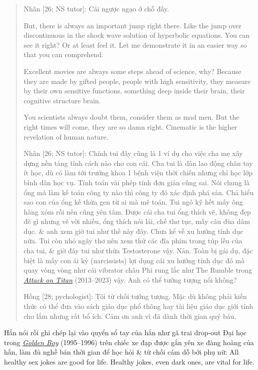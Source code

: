 \documentclass[12pt,twoside]{book}
\begin{document}
\begin{quote}
	{\sf Nhân [26; NS tutor]}: Cái ngược ngạo ở chỗ đấy. 
	
	But, there is always an important jump right there. Like the jump over discontinuous in the shock wave solution of hyperbolic equations. You can see it right? Or at least feel it. Let me demonstrate it in an easier way so that you can comprehend.
	
	Excellent movies are always some steps ahead of science, why? Because they are made by gifted people, people with high sensitivity, they measure by their own sensitive functions, something deep inside their brain, their cognitive structure brain.
	
	You scientists always doubt them, consider them as mad men. But the right times will come, they are so damn right. Cinematic is the higher revelation of human nature.
	
	{\sf Nhân [26; NS tutor]}: Chính tui đây cũng là 1 ví dụ cho việc cha mẹ xây dựng nền tảng tính cách nào cho con cái. Cha tui là dân lao động chân tay ít học, dù có làm tới trưởng khoa 1 bệnh viện thời chiến nhưng chỉ học lớp bình dân học vụ. Tính toán vài phép tính đơn giản cũng sai. Nói chung là ổng mà làm kế toán công ty nào thì công ty đó xác định phá sản. Chả hiểu sao con của ổng kế thừa gen từ ai mà mê toán. Tui ngó kỹ hết mấy ông hàng xóm rồi nên cũng yên tâm. Được cái cha tui ổng thích vẽ, không đẹp đẽ gì nhưng vẽ vời nhiều, ổng thích nói lái, chế thơ tục, mấy câu đùa dâm dục. \& anh xem giờ tui như thế này đây. Chưa kể về xu hướng tính dục nữa. Tui còn nhỏ ngây thơ nên xem thử các đĩa phim trong túp lều của cha tui, \& giờ đây tui như thừa Testosterone vậy. Nản. Toàn bị gái dụ, đặc biệt là mấy con ái kỷ (narcissists) lợi dụng cái xu hướng tính dục đó mà quay vòng vòng như cái vibrator châu Phi rung lắc như The Rumble trong \href{https://www.imdb.com/title/tt2560140}{\it Attack on Titan} (2013--2023) vậy. Anh có thể tưởng tượng nổi không?
		
	{\sf Hồng [28; pychologist]}: Tôi từ chối tưởng tượng. Mặc dù không phải kiến thức có thể đưa vào sách giáo dục phổ thông hay tài liệu giáo dục giới tính cho lắm nhưng rất bổ ích. Cảm ơn anh vì đã dành thời gian quý báu.
\end{quote}
Hắn nói rồi ghi chép lại vào quyển sổ tay của hắn như gã trai drop-out Đại học trong \href{https://www.imdb.com/title/tt0159145/}{\it Golden Boy} (1995--1996) trên chiếc xe đạp được gắn yên xe đàng hoàng của hắn, làm đủ nghề bán thời gian để học hỏi \& từ chối cám dỗ bởi phụ nữ: All healthy sex jokes are good for life. Healthy jokes, even dark ones, are vital for life.
\end{document}
